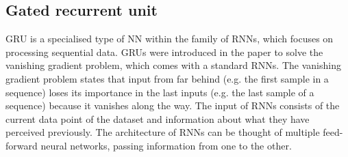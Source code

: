 \subsection{Gated recurrent unit}
\label{sub:Gated-Recurrent-Unit}
\Gls{GRU} is a specialised type of \gls{NN} within the family of \glspl{RNN}, which focuses on processing sequential data. \glspl{GRU} were introduced in the paper \cite{cho_learning_2014} to solve the vanishing gradient problem, which comes with a standard \glspl{RNN}. The vanishing gradient problem states that input from far behind (e.g. the first sample in a sequence) loses its importance in the last inputs (e.g. the last sample of a sequence) because it vanishes along the way. The input of \glspl{RNN} consists of the current data point of the dataset and information about what they have perceived previously. The architecture of \glspl{RNN} can be thought of multiple feed-forward neural networks, passing information from one to the other.

